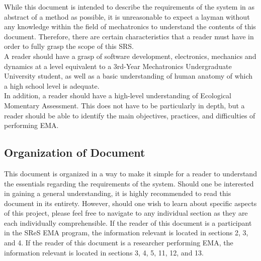 \documentclass[12pt]{article}
\begin{document}
While this document is intended to describe the requirements of the system in as abstract of a method as possible, it is unreasonable to expect a layman without any knowledge within the field of mechatronics to understand the contents of this document. Therefore, there are certain characteristics that a reader must have in order to fully grasp the scope of this SRS. \\

A reader should have a grasp of software development, electronics, mechanics and dynamics at a level equivalent to a 3rd-Year Mechatronics Undergraduate University student, as well as a basic understanding of human anatomy of which a high school level is adequate. \\

In addition, a reader should have a high-level understanding of Ecological Momentary Assessment. This does not have to be particularly in depth, but a reader should be able to identify the main objectives, practices, and difficulties of performing EMA. \\

\subsection{Organization of Document}
This document is organized in a way to make it simple for a reader to understand the essentials regarding the requirements of the system. Should one be interested in gaining a general understanding, it is highly recommended to read this document in its entirety. However, should one wish to learn about specific aspects of this project, please feel free to navigate to any individual section as they are each individually comprehensible. If the reader of this document is a participant in the SReS EMA program, the information relevant is located in sections 2, 3, and 4. If the reader of this document is a researcher performing EMA, the information relevant is located in sections 3, 4, 5, 11, 12, and 13.\\ 



\end{document}

